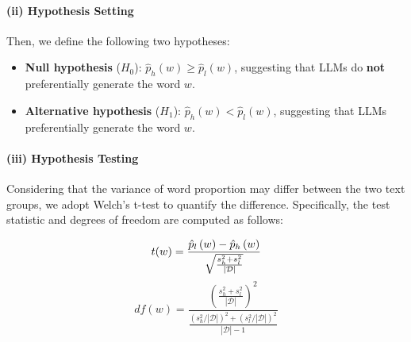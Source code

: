 \paragraph{(ii) Hypothesis Setting}
Then, we define the following two hypotheses:
\begin{itemize}
    \item \textbf{Null hypothesis} ($H_0$): $\hat{p}_h\left( w \right) \geqslant \hat{p}_l\left( w \right) $, suggesting that LLMs do \textbf{not} preferentially generate the word $w$.
    \item \textbf{Alternative hypothesis} ($H_1$): $\hat{p}_h\left( w \right) < \hat{p}_l\left( w \right) $, suggesting that LLMs preferentially generate the word $w$.
    
\end{itemize}




\paragraph{(iii) Hypothesis Testing}

Considering that the variance of word proportion may differ between the two text groups, we adopt Welch's t-test to quantify the difference. Specifically, the test statistic and degrees of freedom are computed as follows:

\begin{equation}
t(w)=\frac{\hat{p}_l\left( w \right) -\hat{p}_h\left( w \right)}{\sqrt{\small{\frac{s_{h}^{2}+s_{l}^{2}}{\left| \mathcal{D} \right|}}}}
\end{equation}
\begin{equation}
    df(w)=\frac{\left( \frac{s_{h}^{2}+s_{l}^{2}}{\left| \mathcal{D} \right|} \right) ^2}{\frac{(s_{h}^{2}/\left| \mathcal{D} \right|)^2+(s_{l}^{2}/\left| \mathcal{D} \right|)^2}{\left| \mathcal{D} \right|-1}}
\end{equation}

